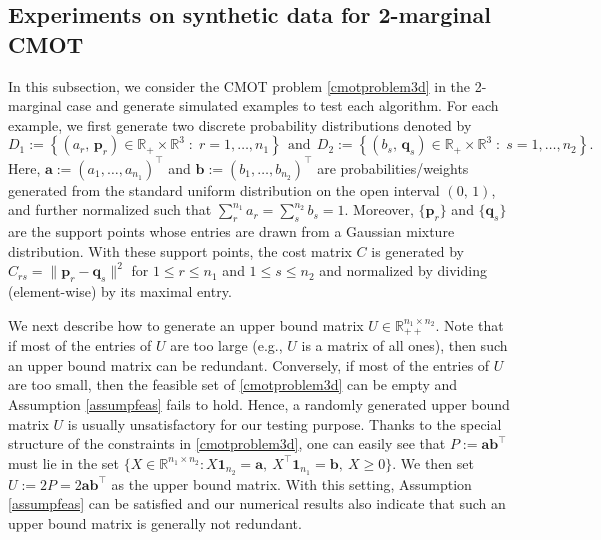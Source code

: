\documentclass[10pt]{article}
\newcommand{\R}{\mathbb R}
\newcommand{\norm}[1]{\left\lVert#1\right\rVert}
\def\norm#1{\|#1\|}
\begin{document}
\subsection{Experiments on synthetic data for 2-marginal CMOT}\label{subsecnum2d}

In this subsection, we consider the CMOT problem \eqref{cmotproblem3d} in the 2-marginal case and generate simulated examples to test each algorithm. For each example, we first generate two discrete probability distributions denoted by
\begin{equation*}
D_1 := \left\{ (a_r, \,\bm{p}_r)\in \R_+\times \R^3\;:\; r = 1,\dots,n_1 \right\} ~~ \mathrm{and} ~~
D_2 := \left\{ (b_s, \,\bm{q}_s)\in \R_+\times \R^3\;:\; s = 1,\dots,n_2
\right\}.
\end{equation*}
Here, $\bm{a}:=(a_1, \dots\!, a_{n_1})^{\top}$ and $\bm{b}:=(b_1, \dots\!, b_{n_2})^{\top}$ are probabilities/weights generated from the standard uniform distribution on the open interval $(0,\,1)$,  and further normalized such that $\sum^{n_1}_ra_r=\sum^{n_2}_sb_s=1$. Moreover, $\{\bm{p}_r\}$ and $\{\bm{q}_s\}$ are the support points whose entries are drawn from a Gaussian mixture distribution.
With these support points, the cost matrix $C$ is generated by $C_{rs} = \norm{\bm{p}_r-\bm{q}_s}^2$ for $1\leq r\leq n_1$ and $1\leq s\leq n_2$ and normalized by dividing (element-wise) by its maximal entry.

We next describe how to generate an upper bound matrix $U\in\mathbb{R}^{n_1 \times n_2}_{++}$. Note that if most of the entries of $U$ are too large (e.g., $U$ is a matrix of all ones), then such an upper bound matrix can be redundant. Conversely, if most of the entries of $U$ are too small, then the feasible set of \eqref{cmotproblem3d} can be empty and Assumption \ref{assumpfeas} fails to hold. Hence, a randomly generated upper bound matrix $U$ is usually unsatisfactory for our testing purpose. Thanks to the special structure of the
constraints in \eqref{cmotproblem3d}, one can easily see that $P:=\bm{a}\bm{b}^{\top}$ must lie in the set $\{X\in\mathbb{R}^{ n_1\times n_2}  : X\bm{1}_{n_2}=\bm{a}, ~X^{\top}\bm{1}_{n_1}=\bm{b}, ~X\geq0\}$. We then set $U:=2P=2\bm{a}\bm{b}^{\top}$ as the upper bound matrix. With this setting,  Assumption \ref{assumpfeas} can be satisfied and our numerical results also indicate that such an upper bound matrix is generally not redundant.
\end{document}
